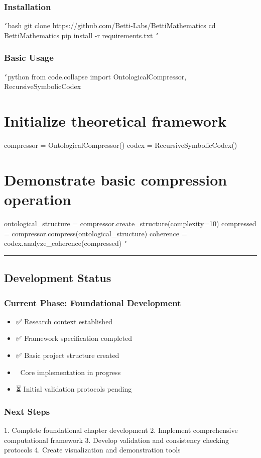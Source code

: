\subsection{Installation}
\texttt{`}bash
git clone https://github.com/Betti-Labs/BettiMathematics
cd BettiMathematics
pip install -r requirements.txt
\texttt{`}

\subsection{Basic Usage}
\texttt{`}python
from code.collapse import OntologicalCompressor, RecursiveSymbolicCodex

\chapter{Initialize theoretical framework}
compressor = OntologicalCompressor()
codex = RecursiveSymbolicCodex()

\chapter{Demonstrate basic compression operation}
ontological_structure = compressor.create_structure(complexity=10)
compressed = compressor.compress(ontological_structure)
coherence = codex.analyze_coherence(compressed)
\texttt{`}

\hrule

\section{Development Status}

\subsection{Current Phase: Foundational Development}
\begin{itemize}
\item ✅ Research context established
\item ✅ Framework specification completed
\item ✅ Basic project structure created
\item 🔄 Core implementation in progress
\item ⏳ Initial validation protocols pending
\end{itemize}

\subsection{Next Steps}
1. Complete foundational chapter development
2. Implement comprehensive computational framework
3. Develop validation and consistency checking protocols
4. Create visualization and demonstration tools

